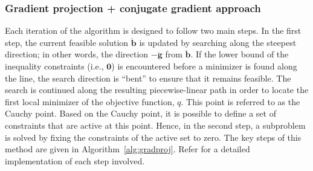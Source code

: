 \documentclass[11pt]{article}
\newcommand{\0}{\phantom{0}}
\begin{document}
\subsubsection{Gradient projection + conjugate gradient approach}

Each iteration of the algorithm is designed to follow two main steps. In the first step, the current feasible solution $\ddot{\bm{b}}$ is updated by searching along the steepest direction; in other words, the direction $-\ddot{\bm{g}}$ from $\ddot{\bm{b}}$. If the lower bound of the inequality constraints (i.e., $\bm{0}$) is encountered before a minimizer is found along the line, the search direction is ``bent'' to ensure that it remains feasible. The search is continued along the resulting piecewise-linear path in order to locate the first local minimizer of the objective function, $q$. This point is referred to as the Cauchy point. Based on the Cauchy point, it is possible to define a set of constraints that are active at this point. Hence, in the second step, a subproblem is solved by fixing the constraints of the active set to zero. The key steps of this method are given in Algorithm~\ref{alg:gradproj}. Refer \citet{Nocedal2006} for a detailed implementation of each step involved.
\end{document}
